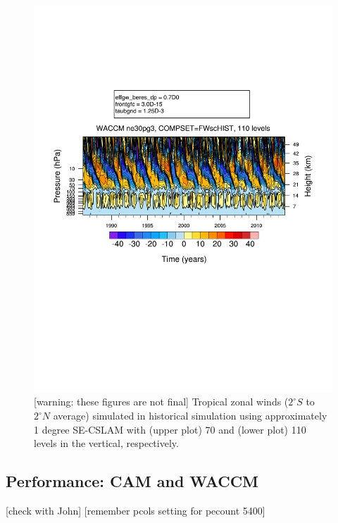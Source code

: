 \documentclass[draft]{agujournal2019}
\begin{document}
\begin{figure}
\noindent\includegraphics[width=\textwidth]{figs/FWscHIST-nlev110.pdf}
\caption{[warning: these figures are not final] Tropical zonal winds ($2^\circ S$ to $2^\circ N$ average) simulated in historical simulation using approximately 1 degree SE-CSLAM with (upper plot) 70 and (lower plot) 110  levels in the vertical, respectively.}
\end{figure}

\subsection{Performance: CAM and WACCM}
[check with John] [remember pcols setting for pecount 5400]
\end{document}
